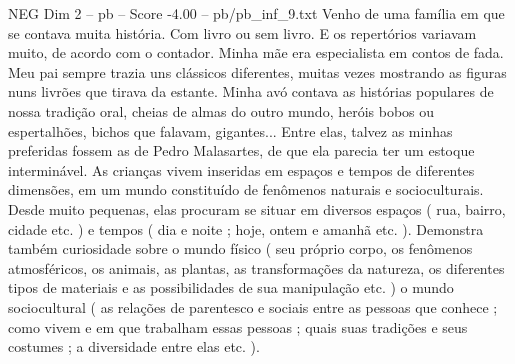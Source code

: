 \begin{textsample}{NEG Dim 2 – pb – Score -4.00 – pb/pb\_inf\_9.txt}
Venho de uma família em que se contava muita história.
Com livro ou sem livro.
E os repertórios variavam muito, de acordo com o contador.
Minha mãe era especialista em contos de fada.
Meu pai sempre trazia uns clássicos diferentes, muitas vezes mostrando as figuras nuns livrões que tirava da estante.
Minha avó contava as histórias populares de nossa tradição oral, cheias de almas do outro mundo, heróis bobos ou espertalhões, bichos que falavam, gigantes...
Entre elas, talvez as minhas preferidas fossem as de Pedro Malasartes, de que ela parecia ter um estoque interminável.
As crianças vivem inseridas em espaços e tempos de diferentes dimensões, em um mundo constituído de fenômenos naturais e socioculturais.
Desde muito pequenas, elas procuram se situar em diversos espaços ( rua, bairro, cidade etc. ) e tempos ( dia e noite ; hoje, ontem e amanhã etc. ).
Demonstra também curiosidade sobre o mundo físico ( seu próprio corpo, os fenômenos atmosféricos, os animais, as plantas, as transformações da natureza, os diferentes tipos de materiais e as possibilidades de sua manipulação etc. ) o mundo sociocultural ( as relações de parentesco e sociais entre as pessoas que conhece ; como vivem e em que trabalham essas pessoas ; quais suas tradições e seus costumes ; a diversidade entre elas etc. ).

\end{textsample}
